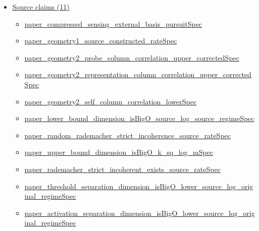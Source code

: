 \documentclass[10pt]{article}
\begin{document}
\begin{itemize}[leftmargin=1.2em]
\item \hyperlink{source-section-f10b5f68e4acf3dc}{Source claims (11)}
\begin{itemize}[leftmargin=1.2em]
\item \hyperlink{source-claim-202b0f5354c0082d}{paper\_\allowbreak{}compressed\_\allowbreak{}sensing\_\allowbreak{}external\_\allowbreak{}basis\_\allowbreak{}pursuitSpec}
\item \hyperlink{source-claim-5da06a1a773efe05}{paper\_\allowbreak{}geometry1\_\allowbreak{}source\_\allowbreak{}constructed\_\allowbreak{}rateSpec}
\item \hyperlink{source-claim-0d1630b3f82fa739}{paper\_\allowbreak{}geometry2\_\allowbreak{}probe\_\allowbreak{}column\_\allowbreak{}correlation\_\allowbreak{}upper\_\allowbreak{}correctedSpec}
\item \hyperlink{source-claim-7f9743bbf88fc45a}{paper\_\allowbreak{}geometry2\_\allowbreak{}representation\_\allowbreak{}column\_\allowbreak{}correlation\_\allowbreak{}upper\_\allowbreak{}correctedSpec}
\item \hyperlink{source-claim-93035163b22de06d}{paper\_\allowbreak{}geometry2\_\allowbreak{}self\_\allowbreak{}column\_\allowbreak{}correlation\_\allowbreak{}lowerSpec}
\item \hyperlink{source-claim-a09ca6c3835d7786}{paper\_\allowbreak{}lower\_\allowbreak{}bound\_\allowbreak{}dimension\_\allowbreak{}isBigO\_\allowbreak{}source\_\allowbreak{}log\_\allowbreak{}source\_\allowbreak{}regimeSpec}
\item \hyperlink{source-claim-5793edfccf93335e}{paper\_\allowbreak{}random\_\allowbreak{}rademacher\_\allowbreak{}strict\_\allowbreak{}incoherence\_\allowbreak{}source\_\allowbreak{}rateSpec}
\item \hyperlink{source-claim-c333ecf427637954}{paper\_\allowbreak{}upper\_\allowbreak{}bound\_\allowbreak{}dimension\_\allowbreak{}isBigO\_\allowbreak{}k\_\allowbreak{}sq\_\allowbreak{}log\_\allowbreak{}mSpec}
\item \hyperlink{source-claim-b773a309f631cb95}{paper\_\allowbreak{}rademacher\_\allowbreak{}strict\_\allowbreak{}incoherent\_\allowbreak{}exists\_\allowbreak{}source\_\allowbreak{}rateSpec}
\item \hyperlink{source-claim-b1fd683d79993219}{paper\_\allowbreak{}threshold\_\allowbreak{}separation\_\allowbreak{}dimension\_\allowbreak{}isBigO\_\allowbreak{}lower\_\allowbreak{}source\_\allowbreak{}log\_\allowbreak{}original\_\allowbreak{}regimeSpec}
\item \hyperlink{source-claim-331e1d36e419216b}{paper\_\allowbreak{}activation\_\allowbreak{}separation\_\allowbreak{}dimension\_\allowbreak{}isBigO\_\allowbreak{}lower\_\allowbreak{}source\_\allowbreak{}log\_\allowbreak{}original\_\allowbreak{}regimeSpec}
\end{itemize}
\end{itemize}
\end{document}
